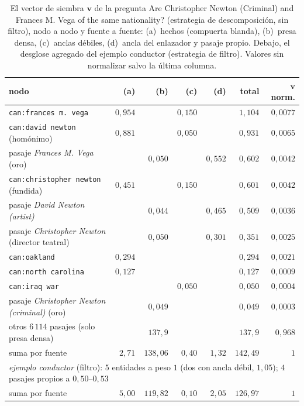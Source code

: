 \documentclass[11pt,a4paper]{article}
\begin{document}
\begin{table}[t]
\centering\footnotesize\setlength{\tabcolsep}{4pt}
\caption{El vector de siembra $\mathbf{v}$ de la pregunta \guillemotleft{}Are
Christopher Newton (Criminal) and Frances M. Vega of the same
nationality?\guillemotright{} (estrategia de descomposición, sin filtro), nodo a nodo
y fuente a fuente: (a)~hechos (compuerta blanda), (b)~presa densa,
(c)~anclas débiles, (d)~ancla del enlazador y pasaje propio. Debajo, el
desglose agregado del ejemplo conductor (estrategia de filtro). Valores
sin normalizar salvo la última columna.}
\label{tab:siembra-ejemplo}
\begin{tabular}{lrrrrrr}
\toprule
nodo & (a) & (b) & (c) & (d) & total & $\mathbf{v}$ norm.\\
\midrule
\texttt{can:frances m. vega} & $0{,}954$ & & $0{,}150$ & & $1{,}104$ & $0{,}0077$\\
\texttt{can:david newton} (homónimo) & $0{,}881$ & & $0{,}050$ & & $0{,}931$ & $0{,}0065$\\
pasaje \emph{Frances M. Vega} (oro) & & $0{,}050$ & & $0{,}552$ & $0{,}602$ & $0{,}0042$\\
\texttt{can:christopher newton} (fundida) & $0{,}451$ & & $0{,}150$ & & $0{,}601$ & $0{,}0042$\\
pasaje \emph{David Newton (artist)} & & $0{,}044$ & & $0{,}465$ & $0{,}509$ & $0{,}0036$\\
pasaje \emph{Christopher Newton} (director teatral) & & $0{,}050$ & & $0{,}301$ & $0{,}351$ & $0{,}0025$\\
\texttt{can:oakland} & $0{,}294$ & & & & $0{,}294$ & $0{,}0021$\\
\texttt{can:north carolina} & $0{,}127$ & & & & $0{,}127$ & $0{,}0009$\\
\texttt{can:iraq war} & & & $0{,}050$ & & $0{,}050$ & $0{,}0004$\\
pasaje \emph{Christopher Newton (criminal)} (oro) & & $0{,}049$ & & & $0{,}049$ & $0{,}0003$\\
otros $6\,114$ pasajes (solo presa densa) & & $137{,}9$ & & & $137{,}9$ & $0{,}968$\\
\midrule
suma por fuente & $2{,}71$ & $138{,}06$ & $0{,}40$ & $1{,}32$ & $142{,}49$ & $1$\\
\midrule
\multicolumn{7}{l}{\emph{ejemplo conductor} (filtro): $5$ entidades a peso $1$ (dos con ancla débil, $1{,}05$); $4$ pasajes propios a $0{,}50$--$0{,}53$}\\
suma por fuente & $5{,}00$ & $119{,}82$ & $0{,}10$ & $2{,}05$ & $126{,}97$ & $1$\\
\bottomrule
\end{tabular}
\end{table}
\end{document}
